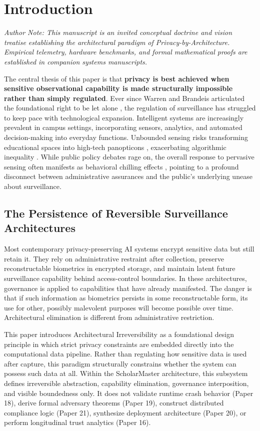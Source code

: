 \documentclass[conference]{IEEEtran}
\begin{document}
\section{Introduction}
\textit{Author Note: This manuscript is an invited conceptual doctrine and vision treatise establishing the architectural paradigm of Privacy-by-Architecture. Empirical telemetry, hardware benchmarks, and formal mathematical proofs are established in companion systems manuscripts.}


The central thesis of this paper is that \textbf{privacy is best achieved when sensitive observational capability is made structurally impossible rather than simply regulated}. Ever since Warren and Brandeis articulated the foundational right to be let alone \cite{b26}, the regulation of surveillance has struggled to keep pace with technological expansion. Intelligent systems are increasingly prevalent in campus settings, incorporating sensors, analytics, and automated decision-making into everyday functions. Unbounded sensing risks transforming educational spaces into high-tech panopticons \cite{b1}, exacerbating algorithmic inequality \cite{b11, b22}. While public policy debates rage on, the overall response to pervasive sensing often manifests as behavioral chilling effects \cite{b8}, pointing to a profound disconnect between administrative assurances and the public's underlying unease about surveillance.

\subsection{The Persistence of Reversible Surveillance Architectures}
Most contemporary privacy-preserving AI systems encrypt sensitive data but still retain it. They rely on administrative restraint after collection, preserve reconstructable biometrics in encrypted storage, and maintain latent future surveillance capability behind access-control boundaries. In these architectures, governance is applied to capabilities that have already manifested. The danger is that if such information as biometrics persists in some reconstructable form, its use for other, possibly malevolent purposes will become possible over time. Architectural elimination is different from administrative restriction.

This paper introduces Architectural Irreversibility as a foundational design principle in which strict privacy constraints are embedded directly into the computational data pipeline. Rather than regulating how sensitive data is used after capture, this paradigm structurally constrains whether the system can possess such data at all. Within the ScholarMaster architecture, this subsystem defines irreversible abstraction, capability elimination, governance interposition, and visible boundedness only. It does not validate runtime crash behavior (Paper 18), derive formal adversary theorems (Paper 19), construct distributed compliance logic (Paper 21), synthesize deployment architecture (Paper 20), or perform longitudinal trust analytics (Paper 16).
\end{document}
